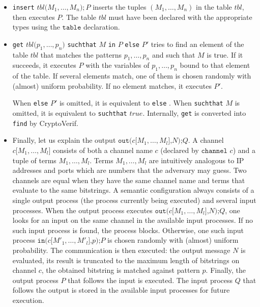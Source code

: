 \begin{itemize}
\item \texttt{insert} $\mathit{tbl}\texttt{(}M_1, \ldots, M_n\texttt{)}; P$
inserts the tuples $(M_1, \ldots, M_n)$ in the table $\mathit{tbl}$, 
then executes $P$.
The table $\mathit{tbl}$ must have been declared with the appropriate
types using the $\texttt{table}$ declaration.

\item \texttt{get} $\mathit{tbl}\texttt{(}p_1, \ldots, p_n\texttt{)}$ \texttt{suchthat} $M$ \texttt{in} $P$ \texttt{else} $P'$ tries to find an element of the table $\mathit{tbl}$ that matches the patterns $p_1, \ldots, p_n$ and such that $M$ is true. If it succeeds, it executes $P$ with the variables of $p_1, \ldots, p_n$ bound to that element of the table. If several elements match, one of them is chosen randomly with (almost) uniform probability. If no element matches, it executes $P'$. 

When \texttt{else} $P'$ is omitted, it is equivalent to \texttt{else} \yield. When \texttt{suchthat} $M$ is omitted, it is equivalent to \texttt{suchthat} $\mathit{true}$. Internally, \texttt{get} is converted into \texttt{find} by CryptoVerif.

\ifchannels
\item
Finally, let us explain the output $\texttt{out(}c\texttt{[}M_1,
\ldots, M_l\texttt{],}N\texttt{);}Q$.  A channel $c\texttt{[}M_1,
\ldots, M_l\texttt{]}$ consists of both a channel name $c$ (declared
by $\texttt{channel }c$) and a tuple of terms $M_1, \ldots, M_l$.  Terms
$M_1, \ldots, M_l$ are intuitively analogous to IP addresses and ports
which are numbers that the adversary may guess.  Two channels are
equal when they have the same channel name and terms that evaluate to
the same bitstrings.
%
A semantic configuration always consists of a single output process
(the process currently being executed) and several input processes.
When the output process executes $\texttt{out(}c\texttt{[}M_1, \ldots,
M_l\texttt{],}N\texttt{);}Q$, one looks for an input on the same
channel in the available input processes. If no such input process is
found, the process blocks.  Otherwise, one such input process
$\texttt{in(}c\texttt{[}M'_1, \ldots, M'_l\texttt{],}p\texttt{);}P $
is chosen randomly with (almost) uniform probability. The communication is then
executed: the output message $N$ is evaluated, its result is truncated
to the maximum length of bitstrings on channel $c$, the obtained
bitstring is matched against pattern $p$.  Finally, the output process
$P$ that follows the input is executed. The input process $Q$ that
follows the output is stored in the available input processes for
future execution.


\end{itemize}
